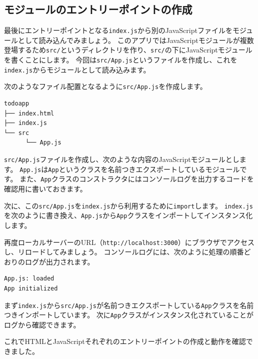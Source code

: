 \hypertarget{module-entry-point}{%
\subsection{モジュールのエントリーポイントの作成}\label{module-entry-point}}

最後にエントリーポイントとなる\texttt{index.js}から別のJavaScriptファイルをモジュールとして読み込んでみましょう。
このアプリではJavaScriptモジュールが複数登場するため\texttt{src/}というディレクトリを作り、\texttt{src/}の下にJavaScriptモジュールを書くことにします。
今回は\texttt{src/App.js}というファイルを作成し、これを\texttt{index.js}からモジュールとして読み込みます。

次のようなファイル配置となるように\texttt{src/App.js}を作成します。

\begin{lstlisting}
todoapp
├── index.html
├── index.js
└── src
      └── App.js
\end{lstlisting}
\newpage
\texttt{src/App.js}ファイルを作成し、次のような内容のJavaScriptモジュールとします。
\texttt{App.js}は\texttt{App}というクラスを名前つきエクスポートしているモジュールです。
また、\texttt{App}クラスのコンストラクタにはコンソールログを出力するコードを確認用に書いておきます。



次に、この\texttt{src/App.js}を\texttt{index.js}から利用するために\texttt{import}します。
\texttt{index.js}を次のように書き換え、\texttt{App.js}から\texttt{App}クラスをインポートしてインスタンス化します。



再度ローカルサーバーのURL（\texttt{http://localhost:3000}）にブラウザでアクセスし、リロードしてみましょう。
コンソールログには、次のように処理の順番どおりのログが出力されます。

\begin{lstlisting}
App.js: loaded
App initialized
\end{lstlisting}

まず\texttt{index.js}から\texttt{src/App.js}が名前つきエクスポートしている\texttt{App}クラスを名前つきインポートしています。
次に\texttt{App}クラスがインスタンス化されていることがログから確認できます。

これでHTMLとJavaScriptそれぞれのエントリーポイントの作成と動作を確認できました。

